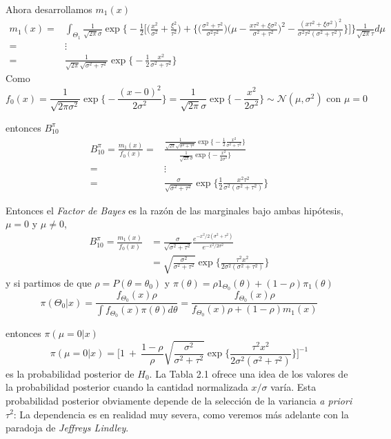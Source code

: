 \documentclass[12pt,]{article}
\begin{document}
Ahora desarrollamos \(m_1(x)\) \[
\begin{array}{rl}
m_1(x)=&\displaystyle \int_{\Theta_1}\frac{1}{\sqrt{2\pi}\sigma}\exp\bigg\{ -\frac{1}{2}\bigg[\bigg(\frac{x^2}{\sigma^2}+\frac{\xi^2}{\tau^2} \bigg)+\bigg\{\bigg(\frac{\sigma^2+\tau^2}{\sigma^2\tau^2} \bigg)\bigg(\mu -  \frac{x\tau^2+\xi\sigma^2}{\sigma^2+\tau^2} \bigg)^2-
\frac{(x\tau^2+\xi\sigma^2)^2}{\sigma^2\tau^2(\sigma^2+\tau^2)}  \bigg\}  \bigg]\bigg\}\frac{1}{\sqrt{2\pi}\tau}d\mu\\
=&\vdots\\
=&\frac{1}{\sqrt{2\pi}\sqrt{\sigma^2+\tau^2}}\exp\bigg\{ -\frac{1}{2}\frac{x^2}{\sigma^2+\tau^2}\bigg\}
\end{array}
\] Como \[
f_0(x)=\frac{1}{\sqrt{2\pi\sigma^2}}\exp\bigg\{-\frac{(x-0)^2}{2\sigma^2} \bigg\}=\frac{1}{\sqrt{2\pi}\sigma}\exp\bigg\{-\frac{x^2}{2\sigma^2} \bigg\}\sim\mathcal{N(\mu,\sigma^2)}\text{ con }\mu=0
\]

entonces \(B_{10}^\pi\) \[
\begin{array}{rl}
B_{10}^\pi=\frac{m_1(x)}{f_0(x)}=&\frac{\frac{1}{\sqrt{2\pi}\sqrt{\sigma^2+\tau^2}}\exp\bigg\{ -\frac{1}{2}\frac{x^2}{\sigma^2+\tau^2}\bigg\}}{\frac{1}{\sqrt{2\pi}\sigma}\exp\bigg\{-\frac{x^2}{2\sigma^2} \bigg\}}\\
=&\vdots\\
=&\frac{\sigma}{\sqrt{\sigma^2+\tau^2}}\exp\bigg\{\frac{1}{2}\frac{x^2\tau^2}{\sigma^2(\sigma^2+\tau^2)} \bigg\}
\end{array}
\]

Entonces el \emph{Factor de Bayes} es la razón de las marginales bajo
ambas hipótesis, \(\mu=0\) y \(\mu\ne 0\), \[
\begin{array}{ll}
B_{10}^\pi=\displaystyle \frac{m_1(x)}{f_0(x)}&=\displaystyle \frac{\sigma}{\sqrt{\sigma^2+\tau^2}}\frac{e^{-x^2/2(\sigma^2+\tau^2)}}{e^{-x^2/2\sigma^2}} \\
&=\displaystyle \sqrt{\frac{\sigma^2}{\sigma^2+\tau^2}}\exp\bigg\{\frac{\tau^2x^2}{2\sigma^2(\sigma^2+\tau^2)} \bigg\}
\end{array}
\] y si partimos de que \(\rho=P(\theta=\theta_0)\) y
\(\pi(\theta)=\rho 1_{\Theta_0}(\theta)+(1-\rho)\pi_1(\theta)\) \[
\pi(\Theta_0|x)=\frac{f_{\Theta_0}(x)\rho}{\int f_{\Theta_0}(x)\pi(\theta)d\theta}=\frac{f_{\Theta_0}(x)\rho}{f_{\Theta_0}(x)\rho+(1-\rho)m_1(x)}
\]

entonces \(\pi(\mu=0|x)\) \[
\pi(\mu=0|x)=\bigg[1\ +\ \frac{1-\rho}{\rho} \displaystyle \sqrt{\frac{\sigma^2}{\sigma^2+\tau^2}}\exp\bigg\{\frac{\tau^2x^2}{2\sigma^2(\sigma^2+\tau^2)} \bigg\}\bigg]^{-1}
\] es la probabilidad posterior de \(H_0\). La Tabla 2.1 ofrece una idea
de los valores de la probabilidad posterior cuando la cantidad
normalizada \(x/\sigma\) varía. Esta probabilidad posterior obviamente
depende de la selección de la variancia \emph{a priori} \(\tau^2\): La
dependencia es en realidad muy severa, como veremos más adelante con la
paradoja de \emph{Jeffreys Lindley}.
\end{document}
